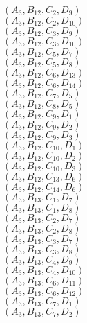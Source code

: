 \documentclass[14pt]{article}
\begin{document}
    $({A}_{3}, {B}_{12}, {C}_{2}, {D}_{9}) $ \\ 
    $({A}_{3}, {B}_{12}, {C}_{2}, {D}_{10}) $ \\ 
    $({A}_{3}, {B}_{12}, {C}_{3}, {D}_{9}) $ \\ 
    $({A}_{3}, {B}_{12}, {C}_{3}, {D}_{10}) $ \\ 
    $({A}_{3}, {B}_{12}, {C}_{5}, {D}_{7}) $ \\ 
    $({A}_{3}, {B}_{12}, {C}_{5}, {D}_{8}) $ \\ 
    $({A}_{3}, {B}_{12}, {C}_{6}, {D}_{13}) $ \\ 
    $({A}_{3}, {B}_{12}, {C}_{6}, {D}_{14}) $ \\ 
    $({A}_{3}, {B}_{12}, {C}_{7}, {D}_{5}) $ \\ 
    $({A}_{3}, {B}_{12}, {C}_{8}, {D}_{5}) $ \\ 
    $({A}_{3}, {B}_{12}, {C}_{9}, {D}_{1}) $ \\ 
    $({A}_{3}, {B}_{12}, {C}_{9}, {D}_{2}) $ \\ 
    $({A}_{3}, {B}_{12}, {C}_{9}, {D}_{3}) $ \\ 
    $({A}_{3}, {B}_{12}, {C}_{10}, {D}_{1}) $ \\ 
    $({A}_{3}, {B}_{12}, {C}_{10}, {D}_{2}) $ \\ 
    $({A}_{3}, {B}_{12}, {C}_{10}, {D}_{3}) $ \\ 
    $({A}_{3}, {B}_{12}, {C}_{13}, {D}_{6}) $ \\ 
    $({A}_{3}, {B}_{12}, {C}_{14}, {D}_{6}) $ \\ 
    $({A}_{3}, {B}_{13}, {C}_{1}, {D}_{7}) $ \\ 
    $({A}_{3}, {B}_{13}, {C}_{1}, {D}_{8}) $ \\ 
    $({A}_{3}, {B}_{13}, {C}_{2}, {D}_{7}) $ \\ 
    $({A}_{3}, {B}_{13}, {C}_{2}, {D}_{8}) $ \\ 
    $({A}_{3}, {B}_{13}, {C}_{3}, {D}_{7}) $ \\ 
    $({A}_{3}, {B}_{13}, {C}_{3}, {D}_{8}) $ \\ 
    $({A}_{3}, {B}_{13}, {C}_{4}, {D}_{9}) $ \\ 
    $({A}_{3}, {B}_{13}, {C}_{4}, {D}_{10}) $ \\ 
    $({A}_{3}, {B}_{13}, {C}_{6}, {D}_{11}) $ \\ 
    $({A}_{3}, {B}_{13}, {C}_{6}, {D}_{12}) $ \\ 
    $({A}_{3}, {B}_{13}, {C}_{7}, {D}_{1}) $ \\ 
    $({A}_{3}, {B}_{13}, {C}_{7}, {D}_{2}) $ \\ 
\end{document}
